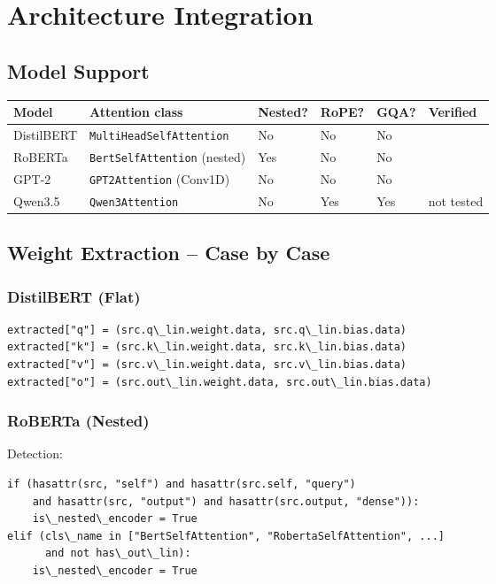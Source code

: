 
\section{Architecture Integration}

\subsection{Model Support}

\begin{table}[H]
\centering
\small
\begin{tabular}{llllll}
\toprule
\textbf{Model} & \textbf{Attention class} & \textbf{Nested?} & \textbf{RoPE?} & \textbf{GQA?} & \textbf{Verified} \\
\midrule
DistilBERT & \texttt{MultiHeadSelfAttention} & No & No & No &  \\
RoBERTa & \texttt{BertSelfAttention} (nested) & Yes & No & No &  \\
GPT-2 & \texttt{GPT2Attention} (Conv1D) & No & No & No &  \\
Qwen3.5 & \texttt{Qwen3Attention} & No & Yes & Yes & not tested \\
\bottomrule
\end{tabular}
\end{table}

\subsection{Weight Extraction -- Case by Case}

\subsubsection{DistilBERT (Flat)}

\begin{lstlisting}
extracted["q"] = (src.q\_lin.weight.data, src.q\_lin.bias.data)
extracted["k"] = (src.k\_lin.weight.data, src.k\_lin.bias.data)
extracted["v"] = (src.v\_lin.weight.data, src.v\_lin.bias.data)
extracted["o"] = (src.out\_lin.weight.data, src.out\_lin.bias.data)
\end{lstlisting}

\subsubsection{RoBERTa (Nested)}

Detection:

\begin{lstlisting}
if (hasattr(src, "self") and hasattr(src.self, "query")
    and hasattr(src, "output") and hasattr(src.output, "dense")):
    is\_nested\_encoder = True
elif (cls\_name in ["BertSelfAttention", "RobertaSelfAttention", ...]
      and not has\_out\_lin):
    is\_nested\_encoder = True
\end{lstlisting}


